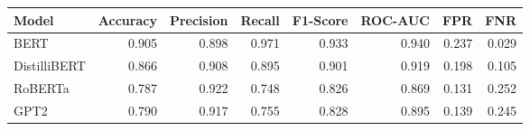 \begin{tabular}{|l||r|r|r|r|r|r|r|}
\toprule
Model & \textbf{Accuracy} & \textbf{Precision} & Recall & \textbf{F1-Score} & \textbf{ROC-AUC} & \textbf{FPR} & FNR \\
\midrule \midrule
BERT & 0.905 & 0.898 & 0.971 & 0.933 & 0.940 & 0.237 & 0.029 \\
DistilliBERT & 0.866 & 0.908 & 0.895 & 0.901 & 0.919 & 0.198 & 0.105 \\
RoBERTa & 0.787 & 0.922 & 0.748 & 0.826 & 0.869 & 0.131 & 0.252 \\
GPT2 & 0.790 & 0.917 & 0.755 & 0.828 & 0.895 & 0.139 & 0.245 \\
\bottomrule
\end{tabular}
